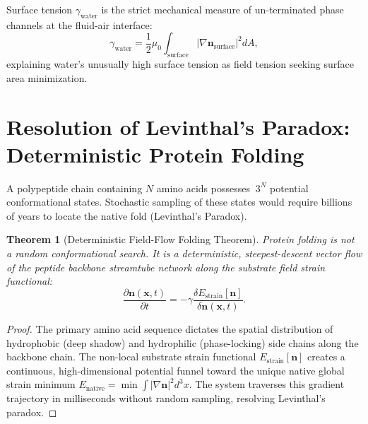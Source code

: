 \documentclass[11pt,a4paper]{article}
\newtheorem{thm}{Theorem}
\begin{document}
	Surface tension $\gamma_{\text{water}}$ is the strict mechanical measure of un-terminated phase channels at the fluid-air interface:
	\begin{equation}
		\gamma_{\text{water}} = \frac{1}{2}\mu_0 \int_{\text{surface}} \left| \nabla \mathbf{n}_{\text{surface}} \right|^2 dA,
	\end{equation}
	explaining water's unusually high surface tension as field tension seeking surface area minimization.
	
	\section{Resolution of Levinthal's Paradox: Deterministic Protein Folding}
	\label{sec:protein_folding}
	
	A polypeptide chain containing $N$ amino acids possesses $~3^N$ potential conformational states. Stochastic sampling of these states would require billions of years to locate the native fold (Levinthal's Paradox).
	
	\begin{thm}[Deterministic Field-Flow Folding Theorem]
		\label{thm:protein_folding_flow}
		Protein folding is not a random conformational search. It is a deterministic, steepest-descent vector flow of the peptide backbone streamtube network along the substrate field strain functional:
		\begin{equation}
			\frac{\partial \mathbf{n}(\mathbf{x}, t)}{\partial t} = -\gamma \frac{\delta E_{\text{strain}}[\mathbf{n}]}{\delta \mathbf{n}(\mathbf{x}, t)}.
			\label{eq:protein_steepest_descent}
		\end{equation}
	\end{thm}
	
	\begin{proof}
		The primary amino acid sequence dictates the spatial distribution of hydrophobic (deep shadow) and hydrophilic (phase-locking) side chains along the backbone chain. The non-local substrate strain functional $E_{\text{strain}}[\mathbf{n}]$ creates a continuous, high-dimensional potential funnel toward the unique native global strain minimum $E_{\text{native}} = \min \int |\nabla \mathbf{n}|^2 d^3x$. The system traverses this gradient trajectory in milliseconds without random sampling, resolving Levinthal's paradox.
	\end{proof}
	
\end{document}

